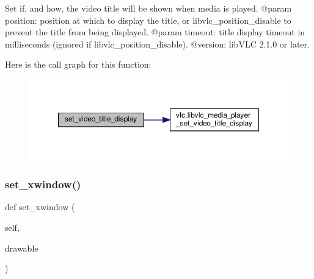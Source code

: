 \begin{DoxyVerb}Set if, and how, the video title will be shown when media is played.
@param position: position at which to display the title, or libvlc_position_disable to prevent the title from being displayed.
@param timeout: title display timeout in milliseconds (ignored if libvlc_position_disable).
@version: libVLC 2.1.0 or later.
\end{DoxyVerb}
 Here is the call graph for this function\+:
\nopagebreak
\begin{figure}[H]
\begin{center}
\leavevmode
\includegraphics[width=350pt]{classvlc_1_1_media_player_afb770de67353fac470a84cb5e15366fa_cgraph}
\end{center}
\end{figure}
\mbox{\label{classvlc_1_1_media_player_aef02cae4b8abcf9618bfd14e5af73c07}} 
\subsubsection{\texorpdfstring{set\+\_\+xwindow()}{set\_xwindow()}}
{\footnotesize\ttfamily def set\+\_\+xwindow (\begin{DoxyParamCaption}\item[{}]{self,  }\item[{}]{drawable }\end{DoxyParamCaption})}

